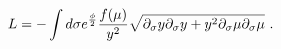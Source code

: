 \begin{equation}
L= -\int d \sigma e^{\phi\over 2} {f(\mu)\over y^2}\sqrt{ \partial_\sigma y
\partial_\sigma y + y^2 \partial_\sigma \mu \partial_\sigma
\mu}\label{acwilb}\ . 
\end{equation}

